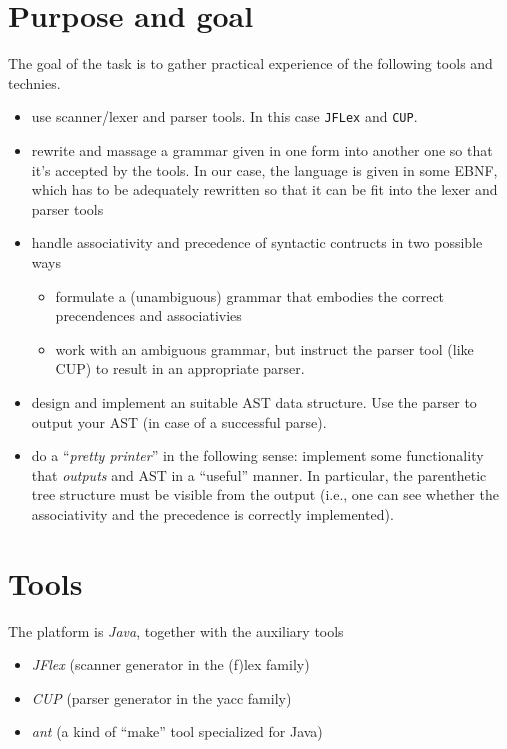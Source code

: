 \documentclass[10pt,freeform]{handout}[2014/08/13]
\begin{document}
\section{Purpose and goal}
\label{sec:x}

The goal of the task is to gather practical experience of the following
tools and technies.
\begin{itemize}
\item use scanner/lexer and parser tools. In this case \texttt{JFLex} and
  \texttt{CUP}.
\item rewrite and massage a grammar given in one form into another one so
  that it's accepted by the tools. In our case, the language is given in
  some EBNF, which has to be adequately rewritten so that it can be fit
  into the lexer and parser tools
\item handle associativity and precedence of syntactic contructs in two
  possible ways
  \begin{itemize}
  \item formulate a (unambiguous) grammar that embodies the correct
    precendences and associativies
  \item work with an ambiguous grammar, but instruct the parser tool (like
    CUP) to result in an appropriate parser.
  \end{itemize}
\item design and implement an suitable AST data structure.  Use the parser
  to output your AST (in case of a successful parse).
\item do a ``\emph{pretty printer}'' in the following sense: implement some
  functionality that \emph{outputs} and AST in a ``useful'' manner. In
  particular, the parenthetic tree structure must be visible from the
  output (i.e., one can see whether the associativity and the precedence is
  correctly implemented). 
\end{itemize}


\section{Tools}

The platform is \emph{Java}, together with the auxiliary tools

\begin{itemize}
\item \textsl{JFlex} (scanner generator in the (f)lex family)
\item \textsl{CUP} (parser generator in the yacc family)
\item \textsl{ant} (a kind of ``make'' tool specialized for Java)
\end{itemize}
\end{document}
